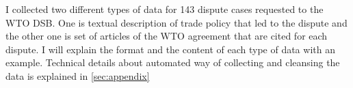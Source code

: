 I collected two different types of data for 143 dispute cases 
requested to the WTO DSB.
One is textual description of trade policy 
that led to the dispute and the other one is 
set of articles of the WTO agreement that are
cited for each dispute. 
I will explain the format and the content of 
each type of data with an example. 
Technical details about automated way 
of collecting and cleansing the data is 
explained in \ref{sec:appendix}












  
    
  
